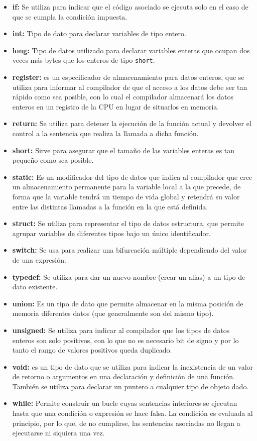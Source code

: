 \begin{itemize}
	\item \textbf{if:} Se utiliza para indicar que el código asociado se ejecuta solo en el caso de que se cumpla la condición impuesta.
	\item \textbf{int:} Tipo de dato para declarar variables de tipo entero.
	\item \textbf{long:} Tipo de datos utilizado para declarar variables enteras que ocupan dos veces más bytes que los enteros de tipo \texttt{short}.
	\item \textbf{register:} es un especificador de almacenamiento para datos enteros, que se utiliza para informar al compilador de que el acceso a los datos debe ser tan rápido como sea posible, con lo cual el compilador almacenará los datos enteros en un registro de la CPU en lugar de situarlos en memoria.
	\item \textbf{return:} Se utiliza para detener la ejecución de la función actual y devolver el control a la sentencia que realiza la llamada a dicha función.
	\item \textbf{short:} Sirve para asegurar que el tamaño de las variables enteras es tan pequeño como sea posible.
	\item \textbf{static:} Es un modificador del tipo de datos que indica al compilador que cree un almacenamiento permanente para la variable local a la que precede, de forma que la variable tendrá un tiempo de vida global y retendrá su valor entre las distintas llamadas a la función en la que está definida.
	\item \textbf{struct:} Se utiliza para representar el tipo de datos estructura, que permite agrupar variables de diferentes tipos bajo un único identificador.
	\item \textbf{switch:} Se usa para realizar una bifurcación múltiple dependiendo del valor de una expresión.
	\item \textbf{typedef:} Se utiliza para dar un nuevo nombre (crear un alias) a un tipo de dato existente.
	\item \textbf{union:} Es un tipo de dato que permite almacenar en la misma posición de memoria diferentes datos (que generalmente son del mismo tipo).
	\item \textbf{unsigned:} Se utiliza para indicar al compilador que los tipos de datos enteros son solo positivos, con lo que no es necesario bit de signo y por lo tanto el rango de valores positivos queda duplicado.
	\item \textbf{void:} es un tipo de dato que se utiliza para indicar la inexistencia de un valor de retorno o argumentos en una declaración y definición de una función. También se utiliza para declarar un puntero a cualquier tipo de objeto dado.
	\item \textbf{while:} Permite construir un bucle cuyas sentencias interiores se ejecutan hasta que una condición o expresión se hace falsa. La condición es evaluada al principio, por lo que, de no cumplirse, las sentencias asociadas no llegan a ejecutarse ni siquiera una vez.
\end{itemize}

